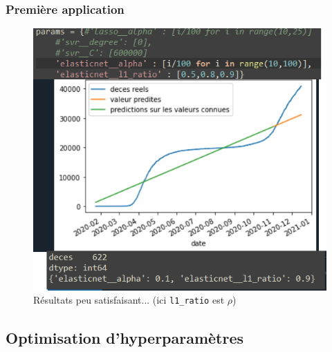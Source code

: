 \documentclass{beamer}
\begin{document}
\begin{frame}
	\frametitle{Première application}
	\begin{figure}
		\includegraphics[scale=0.38]{EN}
		\caption{Résultats peu satisfaisant... (ici \texttt{l1\_ratio} est $\rho$)}
	\end{figure}
\end{frame}

\subsection{Optimisation d'hyperparamètres}
\end{document}
